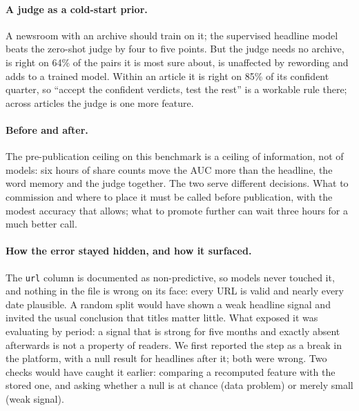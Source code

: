 \documentclass[10pt,a4paper,twocolumn]{article}
\begin{document}
\paragraph{A judge as a cold-start prior.} A newsroom with an archive should train on it; the supervised
headline model beats the zero-shot judge by four to five points. But the judge needs no archive, is right on 64\% of the
pairs it is most sure about, is unaffected by rewording and adds to a trained
model. Within an article it is right on
85\% of its confident quarter, so ``accept the confident verdicts, test the rest'' \citep{li2026jev} is a
workable rule there; across articles the judge is one more feature.

\paragraph{Before and after.} The pre-publication ceiling on this benchmark is a ceiling of information, not of
models: six hours of share counts move the AUC more than the headline, the word memory and the judge together.
The two serve different decisions. What to commission and where to place it must be called before publication,
with the modest accuracy that allows; what to promote further can wait three hours for a much better call.

\paragraph{How the error stayed hidden, and how it surfaced.} The \texttt{url} column is documented as
non-predictive, so models never touched it, and nothing in the file is wrong on its face: every URL is valid and
nearly every date plausible. A random split would have shown a weak headline signal and invited the usual
conclusion that titles matter little. What exposed it was evaluating by period: a signal that is strong for five
months and exactly absent afterwards is not a property of readers. We first reported
the step as a break in the platform, with a null result for headlines after it; both were wrong. Two checks
would have caught it earlier: comparing a recomputed feature with the stored one, and asking whether a null is at
chance (data problem) or merely small (weak signal).
\end{document}
